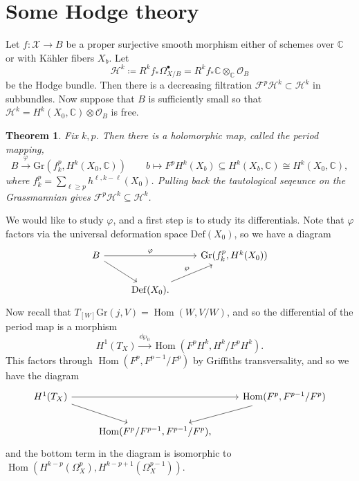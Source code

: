 \documentclass[leqno, openany]{memoir}
\newtheorem{thm}{Theorem}[section]
\theoremstyle{definition}
\theoremstyle{remark}
\theoremstyle{plain}
\theoremstyle{definition}
\theoremstyle{remark}
\newcommand{\C}{\mathbb{C}}
\newcommand{\mc}[1]{\mathcal{#1}}
\newcommand{\mr}[1]{\mathrm{#1}}
\DeclareMathOperator{\Hom}{Hom}
\begin{document}
\section{Some Hodge theory}%
\label{sec:some_hodge_theory}

Let $f \colon \mc{X} \to B$ be a proper surjective smooth morphism either of schemes over $\C$ or with K\"ahler fibers $X_b$. Let
\[ \mc{H}^k \coloneqq R^k f_* \Omega^{\bullet}_{X/B} = R^k f_* \C \otimes_{\C} \mc{O}_B \]
be the Hodge bundle. Then there is a decreasing filtration $\mc{F}^p \mc{H}^k \subset \mc{H}^k$ in subbundles. Now suppose that $B$ is sufficiently small so that $\mc{H}^k = H^k(X_0, \C) \otimes \mc{O}_B$ is free.

\begin{thm}
    Fix $k, p$. Then there is a holomorphic map, called the \textit{period mapping}, 
    \[ B \xrightarrow{\varphi} \mr{Gr}(f_k^p, H^k(X_0, \C)) \qquad b \mapsto F^p H^k(X_b) \subseteq H^k(X_b, \C) \cong H^k(X_0, \C), \]
    where $f_k^p = \sum_{\ell \geq p} h^{\ell, k-\ell}(X_0)$. Pulling back the tautological seqeunce on the Grassmannian gives $\mc{F}^p \mc{H}^k \subseteq \mc{H}^k$.
\end{thm}

We would like to study $\varphi$, and a first step is to study its differentials. Note that $\varphi$ factors via the universal deformation space $\mr{Def}(X_0)$, so we have a diagram
\begin{equation*}
\begin{tikzcd}
    B \ar{rr}{\varphi} \ar{dr} & & \mr{Gr}(f_k^p, H^k(X_0)) \\
    & \mr{Def}(X_0) \ar{ur}{\wp}.
\end{tikzcd}
\end{equation*}
Now recall that $T_{[W]} \mr{Gr}(j, V) = \Hom(W, V/W)$, and so the differential of the period map is a morphism
\[ H^1(T_X) \xrightarrow{\dd{\wp_0}} \Hom(F^p H^k, H^k / F^p H^k). \]
This factors through $\Hom(F^p, F^{p-1}/F^p)$ by Griffiths transversality, and so we have the diagram
\begin{equation*}
\begin{tikzcd}
    H^1(T_X) \ar{rr} \ar{dr} & & \Hom(F^p, F^{p-1}/F^p) \ar{dl} \\
    & \Hom(F^p/F^{p-1}, F^{p-1}/F^p),
\end{tikzcd}
\end{equation*}
and the bottom term in the diagram is isomorphic to $\Hom(H^{k-p}(\Omega^p_X), H^{k-p+1}(\Omega^{p-1}_X))$.
\end{document}
